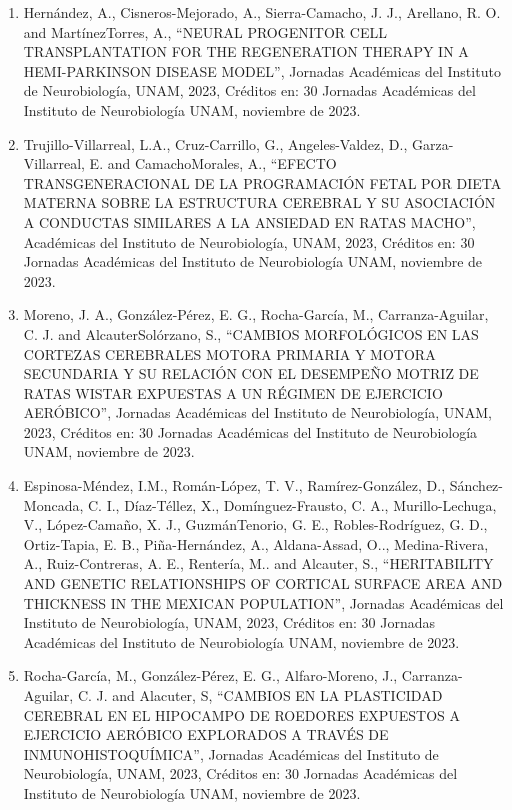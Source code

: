 \begin{enumerate}
\item Hernández, A., Cisneros-Mejorado, A., Sierra-Camacho, J. J., Arellano, R. O. and MartínezTorres, A., “NEURAL PROGENITOR 
CELL TRANSPLANTATION FOR THE REGENERATION THERAPY IN A HEMI-PARKINSON DISEASE MODEL”, Jornadas Académicas del Instituto de 
Neurobiología, UNAM, 2023, Créditos en: 30 Jornadas Académicas del Instituto de Neurobiología UNAM, noviembre de 2023.

\item Trujillo-Villarreal, L.A., Cruz-Carrillo, G., Angeles-Valdez, D., Garza-Villarreal, E. and CamachoMorales, A., “EFECTO 
TRANSGENERACIONAL DE LA PROGRAMACIÓN FETAL POR DIETA MATERNA SOBRE LA ESTRUCTURA CEREBRAL Y SU ASOCIACIÓN A CONDUCTAS 
SIMILARES A LA ANSIEDAD EN RATAS MACHO”, Académicas del Instituto de Neurobiología, UNAM, 2023, Créditos en: 30 Jornadas 
Académicas del Instituto de Neurobiología UNAM, noviembre de 2023.

\item Moreno, J. A., González-Pérez, E. G., Rocha-García, M., Carranza-Aguilar, C. J. and AlcauterSolórzano, S., “CAMBIOS 
MORFOLÓGICOS EN LAS CORTEZAS CEREBRALES MOTORA PRIMARIA Y MOTORA SECUNDARIA Y SU RELACIÓN CON EL DESEMPEÑO MOTRIZ DE RATAS 
WISTAR EXPUESTAS A UN RÉGIMEN DE EJERCICIO AERÓBICO”, Jornadas Académicas del Instituto de Neurobiología, UNAM, 2023, 
Créditos en: 30 Jornadas Académicas del Instituto de Neurobiología UNAM, noviembre de 2023.

\item Espinosa-Méndez, I.M., Román-López, T. V., Ramírez-González, D., Sánchez-Moncada, C. I., Díaz-Téllez, X., 
Domínguez-Frausto, C. A., Murillo-Lechuga, V., López-Camaño, X. J., GuzmánTenorio, G. E., Robles-Rodríguez, G. D., 
Ortiz-Tapia, E. B., Piña-Hernández, A., Aldana-Assad, O.., Medina-Rivera, A., Ruiz-Contreras, A. E., Rentería, M.. and 
Alcauter, S., “HERITABILITY AND GENETIC RELATIONSHIPS OF CORTICAL SURFACE AREA AND THICKNESS IN THE MEXICAN POPULATION”, 
Jornadas Académicas del Instituto de Neurobiología, UNAM, 2023, Créditos en: 30 Jornadas Académicas del Instituto de 
Neurobiología UNAM, noviembre de 2023.

\item Rocha-García, M., González-Pérez, E. G., Alfaro-Moreno, J., Carranza-Aguilar, C. J. and Alacuter, S, “CAMBIOS EN LA 
PLASTICIDAD CEREBRAL EN EL HIPOCAMPO DE ROEDORES EXPUESTOS A EJERCICIO AERÓBICO EXPLORADOS A TRAVÉS DE INMUNOHISTOQUÍMICA”, 
Jornadas Académicas del Instituto de Neurobiología, UNAM, 2023, Créditos en: 30 Jornadas Académicas del Instituto de 
Neurobiología UNAM, noviembre de 2023.


\end{enumerate}
